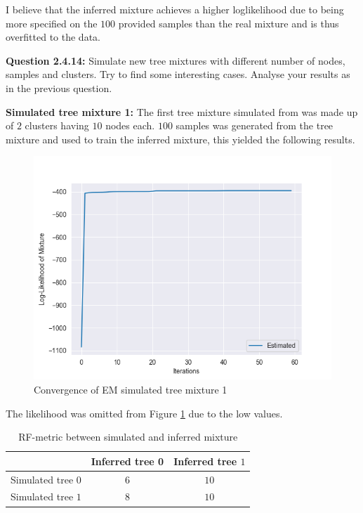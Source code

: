 I believe that the inferred mixture achieves a higher loglikelihood due to being more specified on the $100$ provided samples than the real mixture and is thus overfitted to the data.

\begin{tcolorbox}
\textbf{Question 2.4.14:}
Simulate new tree mixtures with different number of nodes, samples and clusters. Try to find some interesting cases. Analyse your results as in the previous question.
\end{tcolorbox}

\textbf{Simulated tree mixture 1:}
The first tree mixture simulated from was made up of $2$ clusters having $10$ nodes each. $100$ samples was generated from the tree mixture and used to train the inferred mixture, this yielded the following results.

\begin{figure}[H]
  \centering
  \includegraphics[width = \linewidth]{em_likelihoods_simulated_1.png}
  \caption{Convergence of EM simulated tree mixture 1}
  \label{EM_convergence_simulated_1}
\end{figure}

The likelihood was omitted from Figure \ref{EM_convergence_simulated_1} due to the low values.

\begin{table}

  \centering
  \begin{tabular}{ | c | c | c |}
  \hline
   & Inferred tree 0 & Inferred tree $1$ \\ \hline
  Simulated tree $0$ & $6$ & $10$ \\ \hline
  Simulated tree $1$ & $8$ & $10$ \\ \hline

  \end{tabular}
  \caption{RF-metric between simulated and inferred mixture}
  \label{RF-metric_simulated_1_inferred}
\end{table}

